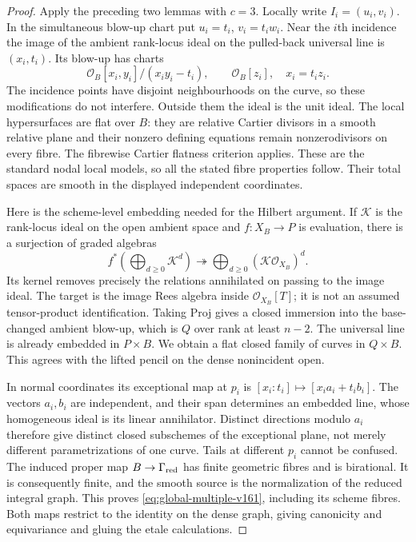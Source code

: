\documentclass[11pt,reqno]{amsart}
\numberwithin{equation}{section}
\theoremstyle{definition}\newtheorem{definition}[theorem]{Definition}
\theoremstyle{remark}\newtheorem{remark}[theorem]{Remark}
\newcommand{\OO}{\mathcal O}\newcommand{\II}{\mathcal I}
\begin{document}
\begin{proof}
Apply the preceding two lemmas with $c=3$. Locally write
$I_i=(u_i,v_i)$. In the simultaneous blow-up chart put
$u_i=t_i$, $v_i=t_iw_i$. Near the $i$th incidence the image of the
ambient rank-locus ideal on the pulled-back universal line is
$(x_i,t_i)$. Its blow-up has charts
\[
 \OO_B[x_i,y_i]/(x_i y_i-t_i),\qquad
 \OO_B[z_i],\quad x_i=t_i z_i.
\]
The incidence points have disjoint neighbourhoods on the curve, so
these modifications do not interfere. Outside them the ideal is the
unit ideal. The local hypersurfaces are flat over $B$: they are
relative Cartier divisors in a smooth relative plane and their
nonzero defining equations remain nonzerodivisors on every fibre.
The fibrewise Cartier flatness criterion applies. These are the
standard nodal local models, so all the stated fibre properties
follow. Their total spaces are smooth in the displayed independent
coordinates.

Here is the scheme-level embedding needed for the Hilbert argument.
If $\mathcal K$ is the rank-locus ideal on the open ambient space and
$f:X_B\to P$ is evaluation, there is a surjection of graded algebras
\begin{equation}\label{eq:rees-surjection-v161}
 f^*\!\left(\bigoplus_{d\geq0}\mathcal K^d\right)
       \twoheadrightarrow
             \bigoplus_{d\geq0}(\mathcal K\OO_{X_B})^d.
\end{equation}
Its kernel removes precisely the relations annihilated on passing to
the image ideal. The target is the image Rees algebra inside
$\OO_{X_B}[T]$; it is not an assumed tensor-product identification.
Taking Proj gives a closed immersion into the base-changed ambient
blow-up, which is $Q$ over rank at least $n-2$. The universal line
is already embedded in $P\times B$. We obtain a flat closed family
of curves in $Q\times B$. This agrees with the lifted pencil on the
dense nonincident open.

In normal coordinates its exceptional map at $p_i$ is
$[x_i:t_i]\mapsto[x_i a_i+t_i b_i]$. The vectors $a_i,b_i$ are
independent, and their span determines an embedded line, whose
homogeneous ideal is its linear annihilator. Distinct directions
modulo $a_i$ therefore give distinct closed subschemes of the
exceptional plane, not merely different parametrizations of one
curve. Tails at different $p_i$ cannot be confused. The induced
proper map $B\to\Gamma_{\rm red}$ has finite geometric fibres and
is birational. It is consequently finite, and the smooth source is
the normalization of the reduced integral graph. This proves
\eqref{eq:global-multiple-v161}, including its scheme fibres. Both
maps restrict to the identity on the dense graph, giving canonicity
and equivariance and gluing the etale calculations.


\end{proof}
\end{document}
